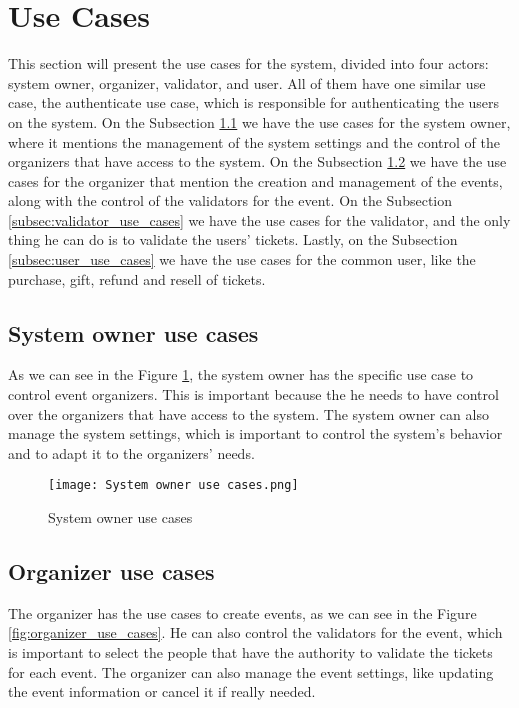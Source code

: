 \section{Use Cases}
\label{sec:use_cases}

This section will present the use cases for the system, divided into four actors: system owner, organizer, validator, and user. All of them have one similar use case, the authenticate use case, which is responsible for authenticating the users on the system.
On the Subsection \ref{subsec:system_owner_use_cases} we have the use cases for the system owner, where it mentions the management of the system settings and the control of the organizers that have access to the system.
On the Subsection \ref{subsec:organizer_use_cases} we have the use cases for the organizer that mention the creation and management of the events, along with the control of the validators for the event.
On the Subsection \ref{subsec:validator_use_cases} we have the use cases for the validator, and the only thing he can do is to validate the users' tickets.
Lastly, on the Subsection \ref{subsec:user_use_cases} we have the use cases for the common user, like the purchase, gift, refund and resell of tickets.

\subsection{System owner use cases}
\label{subsec:system_owner_use_cases}

As we can see in the Figure \ref{fig:system_owner_use_cases}, the system owner has the specific use case to control event organizers. This is important because the he needs to have control over the organizers that have access to the system. The system owner can also manage the system settings, which is important to control the system's behavior and to adapt it to the organizers' needs.

\begin{figure}[H]
    \texttt{[image: System owner use cases.png]}
    \centering
    \caption{System owner use cases}
    \label{fig:system_owner_use_cases}
\end{figure}

\subsection{Organizer use cases}
\label{subsec:organizer_use_cases}

The organizer has the use cases to create events, as we can see in the Figure \ref{fig:organizer_use_cases}. He can also control the validators for the event, which is important to select the people that have the authority to validate the tickets for each event. The organizer can also manage the event settings, like updating the event information or cancel it if really needed.

